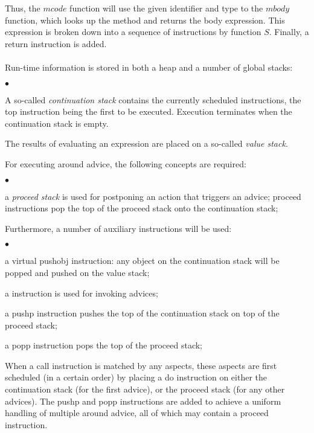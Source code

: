 Thus, the $mcode$ function will use the given identifier and type to the $mbody$ function, which looks up the method and returns the body expression. This expression is broken down into a sequence of instructions by function $S$. Finally, a {\sc return} instruction is added.\\
\\
Run-time information is stored in both a heap and a number of global stacks:
\begin{list}{$\bullet$}{}
\item A so-called \emph{continuation stack} contains the currently scheduled instructions, the top instruction being the first to be executed. Execution terminates when the continuation stack is empty.
\item The results of evaluating an expression are placed on a so-called \emph{value stack}.
\end{list}
For executing around advice, the following concepts are required:
\begin{list}{$\bullet$}{}
\item a \emph{proceed stack} is used for postponing an action that triggers an advice; {\sc proceed} instructions pop the top of the proceed stack onto the continuation stack;
\end{list}
Furthermore, a number of auxiliary instructions will be used: 
\begin{list}{$\bullet$}{}
\item a virtual {\sc pushobj} instruction: any object on the continuation stack will be popped and pushed on the value stack; 
\item a \doI{} instruction is used for invoking advices;
\item a {\sc pushp} instruction pushes the top of the continuation stack on top of the proceed stack;
\item a {\sc popp} instruction pops the top of the proceed stack;
\end{list}

When a {\sc call} instruction is matched by any aspects, these aspects are first scheduled (in a certain order) by placing a {\sc do} instruction on either the continuation stack (for the first advice), or the proceed stack (for any other advices). 
The {\sc pushp} and {\sc popp} instructions are added to achieve a uniform handling of multiple around advice, all of which may contain a {\sc proceed} instruction.
